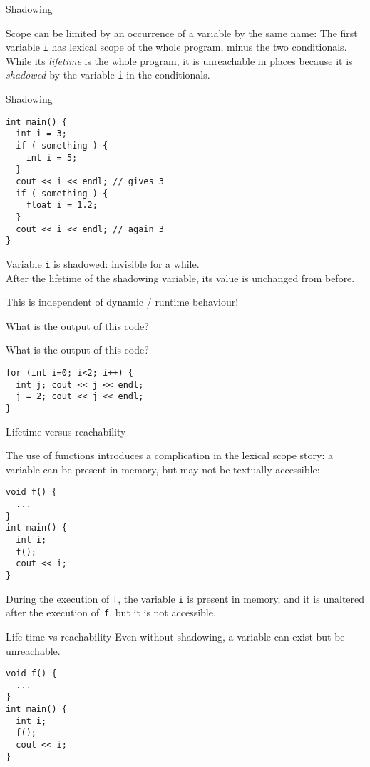  {Shadowing}

Scope can be limited by an occurrence of a variable by the same name:
%
%
The first variable \lstinline{i} has lexical scope of the whole program, minus
the two conditionals. While its
\emph{lifetime} is the whole program, it is
unreachable in places because it is
\emph{shadowed} by the variable \lstinline{i} in the conditionals.

\begin{slide}{Shadowing}
  \label{sl:scope-shadow}
\begin{lstlisting}
int main() {
  int i = 3;
  if ( something ) {
    int i = 5;
  }
  cout << i << endl; // gives 3
  if ( something ) {
    float i = 1.2;
  }
  cout << i << endl; // again 3
}
\end{lstlisting}
Variable \lstinline{i} is shadowed: invisible for a while.\\
After the lifetime of the shadowing variable, its value is unchanged
from before.
\end{slide}

This is independent of dynamic / runtime behaviour!

\begin{exercise}
  \label{ex:shadowfalse}
  What is the output of this code?
\end{exercise}

\begin{exercise}
  \label{ex:loopinitvar}
  What is the output of this code?
\begin{lstlisting}
for (int i=0; i<2; i++) {
  int j; cout << j << endl;
  j = 2; cout << j << endl;
}
\end{lstlisting}
\end{exercise}

 {Lifetime versus reachability}

The use of functions introduces a complication in the lexical scope story:
a variable can be present in memory, but may not be textually accessible:
\begin{lstlisting}
void f() {
  ...
}
int main() {
  int i;
  f();
  cout << i;
}
\end{lstlisting}
During the execution of \lstinline{f}, the variable \lstinline{i} is present in
memory, and it is unaltered after the execution of~\lstinline{f},
but it is not accessible.

\begin{slide}{Life time vs reachability}
  \label{sl:scope-lifetime}
  Even without shadowing, a variable can exist but be unreachable.
\begin{lstlisting}
void f() {
  ...
}
int main() {
  int i;
  f();
  cout << i;
}
\end{lstlisting}
\end{slide}

